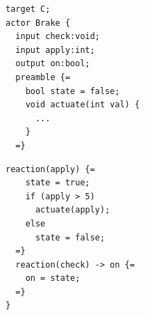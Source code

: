 \documentclass[sigconf]{acmart}
\newcommand{\marten}[1]{\mynote{Marten}{#1}{cyan}}%
\newcommand{\edward}[1]{\mynote{Edward}{#1}{magenta}}%
\begin{document}


\begin{minipage}{0.50\linewidth}
\begin{lstlisting}[language=LF,numbers=none]
target C;
actor Brake {
  input check:void;
  input apply:int;
  output on:bool;
  preamble {=
  	bool state = false;
  	void actuate(int val) { 
  	  ...
  	} 
  =}
\end{lstlisting}
\end{minipage}%
\begin{minipage}{0.50\linewidth}
\begin{lstlisting}[numbers=none]
  reaction(apply) {=
    state = true;
    if (apply > 5)
      actuate(apply);
    else
      state = false;
  =}
  reaction(check) -> on {=
    on = state;
  =}
}
\end{lstlisting}
\end{minipage}
\end{document}
